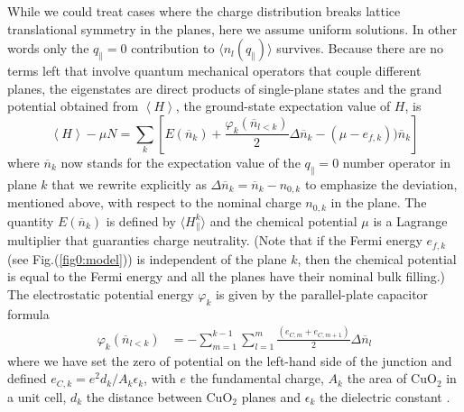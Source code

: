 \documentclass[twocolumn, preprintnumbers,prb,aps,amssymb,showpacs]{revtex4}
\begin{document}
While we could treat cases where the charge distribution breaks lattice translational symmetry in the planes, here we assume uniform solutions. In other words only the $q_{\parallel}=0$ contribution to $\langle n_l(q_{\parallel})\rangle$ survives. Because there are no terms left that involve quantum mechanical operators that couple different planes, the eigenstates are direct products of single-plane states and the grand potential obtained from $\left\langle H\right\rangle$, the ground-state expectation value of $H$, is 
\begin{equation}
\left\langle H\right\rangle - \mu N ={\sum\limits_{k}}\left[E\left( \overline{n}_{k}\right) +%
\frac{\varphi _{k}\left( \overline{n}_{l<k}\right)}{2} \Delta \overline{n}_{k}-\left( \mu
-e_{f,k}\right) )\overline{n}_{k}\right]  \label{ham_tot}
\end{equation}
where $\overline{n}_{k}$ now stands for the expectation value of the $q_{\parallel}=0$ number operator in plane $k$ that we rewrite explicitly as  $\Delta \overline{n}_{k}=\overline{n}_{k}-n_{0,k}$ to emphasize the deviation, mentioned above, with respect to the nominal charge $n_{0,k}$ in the plane. The quantity $E(\overline{n}_{k})$ is defined by $\langle H^k_{\parallel}\rangle$ and the chemical potential $\mu$ is a Lagrange multiplier that guaranties charge neutrality. (Note that if the Fermi energy $e_{f,k}$ (see Fig.(\ref{fig0:model})) is independent of the plane $k$, then the chemical potential is equal to the Fermi energy and all the planes have their nominal bulk filling.) The electrostatic potential energy $\varphi _{k}$ is given by the parallel-plate capacitor formula
\begin{align}
\varphi _{k}\left( \overline{n}_{l<k}\right) & =-\sum\limits_{m
=1}^{k-1}\sum_{l=1}^{m }\frac{\left( e_{C,m }+e_{C,m
+1}\right) }{2}\Delta \overline{n}_{l} \label{Charge_energy}
\end{align}
where we have set the zero of potential on the left-hand side of the junction and defined $e_{C,k} =e^{2}d_{k}/A_{k}\epsilon _{k}$, with $e$ the fundamental charge, $A_{k}$ the area of CuO$_{2}$ in a
unit cell, $d_{k}$ the distance between CuO$_{2}$ planes and $\epsilon
_{k}$ the dielectric constant \cite{chen_electronic_2007}.  
\end{document}
